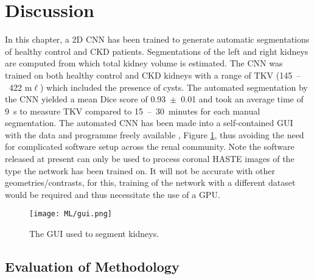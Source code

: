 \newpage

\section{Discussion}
In this chapter, a 2D \ac{CNN} has been trained to generate automatic segmentations of healthy control and \ac{CKD} patients. Segmentations of the left and right kidneys are computed from which total kidney volume is estimated. The \ac{CNN} was trained on both healthy control and \ac{CKD} kidneys with a range of \ac{TKV} (145~–~422 m$\ell$) which included the presence of cysts. The automated segmentation by the \ac{CNN} yielded a mean Dice score of 0.93~$\pm$~0.01 and took an average time of 9~s to measure \ac{TKV} compared to 15~–~30~minutes \cite{zollner_assessment_2012} for each manual segmentation. The automated \ac{CNN} has been made into a self-contained \ac{GUI} with the data and programme freely available \cite{daniel_alexdaniel654renal_segmentor_2020}, Figure \ref{fig:ml_gui}, thus avoiding the need for complicated software setup across the renal community. Note the software released at present can only be used to process coronal \ac{HASTE} images of the type the network has been trained on. It will not be accurate with other geometries/contrasts, for this, training of the network with a different dataset would be required and thus necessitate the use of a \ac{GPU}.

\begin{figure}[H]
	\centering
	\texttt{[image: ML/gui.png]}
	\caption{The \acf{GUI} used to segment kidneys.}
	\label{fig:ml_gui}	
\end{figure}

\newpage
\subsection{Evaluation of Methodology}

